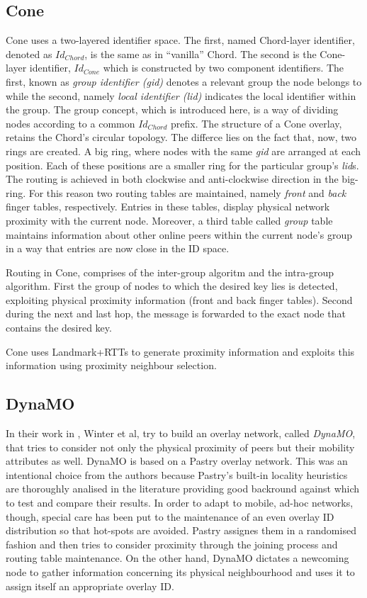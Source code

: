\documentclass[a4paper,10pt]{article}
\begin{document}
\subsection{Cone}
Cone\cite{wang_cone_2007} uses a two-layered identifier space. The first, named Chord-layer identifier, denoted as $Id_{Chord}$, is the same as in ``vanilla'' Chord. The second is the Cone-layer identifier, $Id_{Cone}$ which is constructed by two component identifiers. The first, known as \emph{group identifier (gid)} denotes a relevant group the node belongs to while the second, namely \emph{local identifier (lid)} indicates the local identifier within the group. The group concept, which is introduced here, is a way of dividing nodes according to a common $Id_{Chord}$ prefix.
The structure of a Cone overlay, retains the Chord's circular topology. The differce lies on the fact that, now, two rings are created. A big ring, where nodes with the same \emph{gid} are arranged at each position. Each of these positions are a smaller ring for the particular group's \emph{lid}s. The routing is achieved in both clockwise and anti-clockwise direction in the big-ring. For this reason two routing tables are maintained, namely \emph{front} and \emph{back} finger tables, respectively. Entries in these tables, display physical network proximity with the current node. Moreover, a third table called \emph{group} table maintains information about other online peers within the current node's group in a way that entries are now close in the ID space.

Routing in Cone, comprises of the inter-group algoritm and the intra-group algorithm. First the group of nodes to which the desired key lies is detected, exploiting physical proximity information (front and back finger tables). Second during the next and last hop, the message is forwarded to the exact node that contains the desired key.

Cone uses Landmark+RTTs to generate proximity information and exploits this information using proximity neighbour selection.

\subsection{DynaMO}
In their work in \cite{winter_dynamo_2004}, Winter et al, try to build an overlay network, called \emph{DynaMO}, that tries to consider not only the physical proximity of peers but their mobility attributes as well. DynaMO is based on a Pastry overlay network. This was an intentional choice from the authors because Pastry's built-in locality heuristics are thoroughly analised in the literature \cite{castro_proximityp2p_2002} providing good backround against which to test and compare their results.  In order to adapt to mobile, ad-hoc networks, though, special care has been put to the maintenance of an even overlay ID distribution so that hot-spots are avoided. Pastry assignes them in a randomised fashion and then tries to consider proximity through the joining process and routing table maintenance. On the other hand, DynaMO dictates a newcoming node to gather information concerning its physical neighbourhood and uses it to assign itself an appropriate overlay ID.
\end{document}
